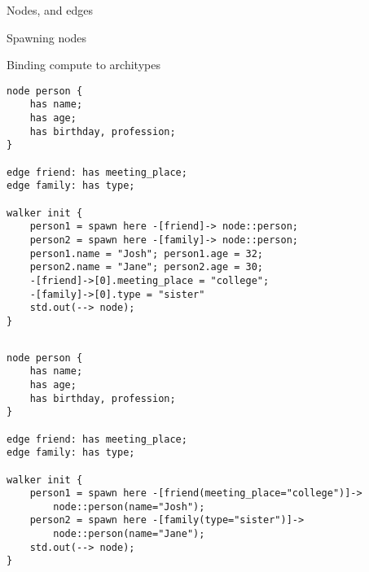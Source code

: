 
Nodes, and edges

Spawning nodes

Binding compute to architypes



\begin{description}
    \begin{lstlisting}[caption={Binding member contexts to nodes and edges}]
node person {
    has name;
    has age;
    has birthday, profession;
}

edge friend: has meeting_place;
edge family: has type;

walker init {
    person1 = spawn here -[friend]-> node::person;
    person2 = spawn here -[family]-> node::person;
    person1.name = "Josh"; person1.age = 32;
    person2.name = "Jane"; person2.age = 30;
    -[friend]->[0].meeting_place = "college";
    -[family]->[0].type = "sister"
    std.out(--> node);
}
    \end{lstlisting}
    \item[Output] \texttt{}
          \begin{lstlisting}[language=shell]
        \end{lstlisting}
    \item[Description] \texttt{}
\end{description}


\begin{description}
    \begin{lstlisting}[caption={Binding contexts with less code}]
node person {
    has name;
    has age;
    has birthday, profession;
}

edge friend: has meeting_place;
edge family: has type;

walker init {
    person1 = spawn here -[friend(meeting_place="college")]->
        node::person(name="Josh");
    person2 = spawn here -[family(type="sister")]->
        node::person(name="Jane");
    std.out(--> node);
}
    \end{lstlisting}
    \item[Output] \texttt{}
          \begin{lstlisting}[language=shell]
        \end{lstlisting}
    \item[Description] \texttt{}
\end{description}


